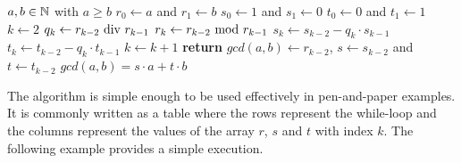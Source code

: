 \begin{algorithm}\caption{Extended Euclidean Algorithm}
\label{alg_ext_euclid_alg}
\begin{algorithmic}[0]
\Require $a,b \in \mathbb{N}$ with $a\geq b$
\State $r_0\gets a$ and $r_1\gets b$
\State $s_0\gets 1$ and $s_1\gets 0$
\State $t_0\gets 0$ and $t_1\gets 1$
\State $k\gets 2$
\State $ q_k\gets r_{k-2} \text{ div } r_{k-1} $
\State $ r_{k}\gets r_{k-2} \text{ mod } r_{k-1} $
\State $ s_{k}\gets s_{k-2} -q_k \cdot s_{k-1} $
\State $ t_{k}\gets t_{k-2} -q_k \cdot t_{k-1} $
\State $ k \gets k + 1 $
\EndWhile
\State \textbf{return} $gcd(a,b)\gets r_{k-2}$, $s\gets s_{k-2}$ and $ t \gets t_{k-2} $
\EndProcedure
\Ensure $ gcd (a, b) = s \cdot a + t \cdot b $
\end{algorithmic}
\end{algorithm}
The algorithm is simple enough to be used effectively in pen-and-paper examples. It is commonly written as a table where the rows represent the while-loop and the columns represent the values of the array $r$, $s$ and $t$ with index $k$. The following example provides a simple execution.
